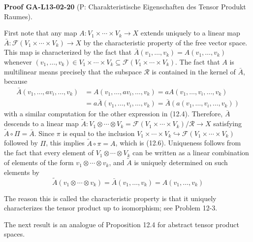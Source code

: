 \documentclass[10pt, letterpaper]{article}
\newcommand{\CustomHeading}[3]{%
  \par\medskip\noindent%
  \textbf{#1 #2} \textnormal{(#3)}.\enskip%
}
\newenvironment{PROOF}[2]{\begin{unitbox}\CustomHeading{Proof}{#1}{#2}}{\end{unitbox}}
\begin{document}
\begin{PROOF}{GA-L13-02-20}{P: Charakteristische Eigenschaften des Tensor Produkt Raumes}
First note that any map $A: V_{1} \times \cdots \times V_{k} \rightarrow X$ extends uniquely to a linear map $\bar{A}: \mathcal{F}\left(V_{1} \times \cdots \times V_{k}\right) \rightarrow X$ by the characteristic property of the free vector space. This map is characterized by the fact that $\bar{A}\left(v_{1}, \ldots, v_{k}\right)=A\left(v_{1}, \ldots, v_{k}\right)$ whenever $\left(v_{1}, \ldots, v_{k}\right) \in V_{1} \times \cdots \times V_{k} \subseteq \mathscr{F}\left(V_{1} \times \cdots \times V_{k}\right)$. The fact that $A$ is multilinear means precisely that the subspace $\mathcal{R}$ is contained in the kernel of $\bar{A}$, because
$$
\begin{aligned}
\bar{A}\left(v_{1}, \ldots, a v_{i}, \ldots, v_{k}\right) & =A\left(v_{1}, \ldots, a v_{i}, \ldots, v_{k}\right)=a A\left(v_{1}, \ldots, v_{i}, \ldots, v_{k}\right) \\
& =a \bar{A}\left(v_{1}, \ldots, v_{i}, \ldots, v_{k}\right)=\bar{A}\left(a\left(v_{1}, \ldots, v_{i}, \ldots, v_{k}\right)\right)
\end{aligned}
$$
with a similar computation for the other expression in (12.4). Therefore, $\bar{A}$ descends to a linear map $\tilde{A}: V_{1} \otimes \cdots \otimes V_{k}=\mathscr{F}\left(V_{1} \times \cdots \times V_{k}\right) / \mathcal{R} \rightarrow X$ satisfying $\tilde{A} \circ \Pi=\bar{A}$. Since $\pi$ is equal to the inclusion $V_{1} \times \cdots \times V_{k} \hookrightarrow \mathscr{F}\left(V_{1} \times \cdots \times V_{k}\right)$ followed by $\Pi$, this implies $\tilde{A} \circ \pi=A$, which is (12.6). Uniqueness follows from the fact that every element of $V_{1} \otimes \cdots \otimes V_{k}$ can be written as a linear combination of elements of the form $v_{1} \otimes \cdots \otimes v_{k}$, and $\tilde{A}$ is uniquely determined on such elements by
$$
\tilde{A}\left(v_{1} \otimes \cdots \otimes v_{k}\right)=\bar{A}\left(v_{1}, \ldots, v_{k}\right)=A\left(v_{1}, \ldots, v_{k}\right)
$$
\end{PROOF}



The reason this is called the characteristic property is that it uniquely characterizes the tensor product up to isomorphism; see Problem 12-3.



The next result is an analogue of Proposition 12.4 for abstract tensor product spaces.
\end{document}
